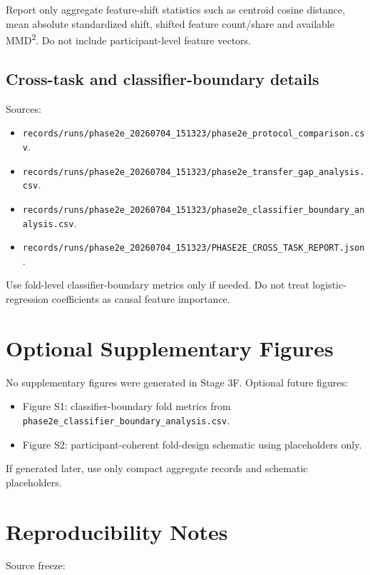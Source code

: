 \documentclass[lettersize,journal]{IEEEtran}
\begin{document}
Report only aggregate feature-shift statistics such as centroid cosine distance, mean absolute standardized shift, shifted feature count/share and available MMD\textsuperscript{2}. Do not include participant-level feature vectors.

\subsection{Cross-task and classifier-boundary details}

Sources:

\begin{itemize}
\item \texttt{records/runs/phase2e\_20260704\_151323/phase2e\_protocol\_comparison.csv}.
\item \texttt{records/runs/phase2e\_20260704\_151323/phase2e\_transfer\_gap\_analysis.csv}.
\item \texttt{records/runs/phase2e\_20260704\_151323/phase2e\_classifier\_boundary\_analysis.csv}.
\item \texttt{records/runs/phase2e\_20260704\_151323/PHASE2E\_CROSS\_TASK\_REPORT.json}.
\end{itemize}

Use fold-level classifier-boundary metrics only if needed. Do not treat logistic-regression coefficients as causal feature importance.

\section{Optional Supplementary Figures}

No supplementary figures were generated in Stage 3F. Optional future figures:

\begin{itemize}
\item Figure S1: classifier-boundary fold metrics from \texttt{phase2e\_classifier\_boundary\_analysis.csv}.
\item Figure S2: participant-coherent fold-design schematic using placeholders only.
\end{itemize}

If generated later, use only compact aggregate records and schematic placeholders.

\section{Reproducibility Notes}

Source freeze:
\end{document}
